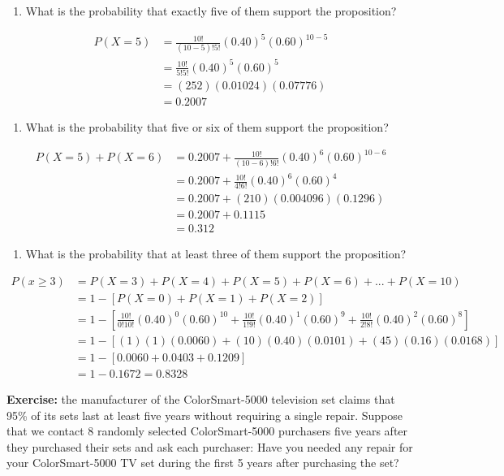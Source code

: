 \documentclass[
]{book}
\providecommand{\tightlist}{%
  \setlength{\itemsep}{0pt}\setlength{\parskip}{0pt}}
\begin{document}
\begin{enumerate}
\def\labelenumi{\arabic{enumi}.}
\tightlist
\item
  What is the probability that exactly five of them support the proposition?
\end{enumerate}

\[
\begin{aligned}
P(X=5)&=\frac{10!}{(10-5)!5!}(0.40)^5(0.60)^{10-5} \\
&=\frac{10!}{5!5!}(0.40)^5(0.60)^5 \\
&=(252)(0.01024)(0.07776) \\
&=0.2007
\end{aligned}
\]

\begin{enumerate}
\def\labelenumi{\arabic{enumi}.}
\setcounter{enumi}{1}
\tightlist
\item
  What is the probability that five or six of them support the proposition?
\end{enumerate}

\[
\begin{aligned}
P(X=5)+P(X=6)&=0.2007+\frac{10!}{(10-6)!6!}(0.40)^6(0.60)^{10-6} \\
&=0.2007+\frac{10!}{4!6!}(0.40)^6(0.60)^4 \\
&=0.2007+(210)(0.004096)(0.1296) \\
&=0.2007+0.1115 \\
&=0.312
\end{aligned}
\]

\begin{enumerate}
\def\labelenumi{\arabic{enumi}.}
\setcounter{enumi}{2}
\tightlist
\item
  What is the probability that at least three of them support the proposition?
\end{enumerate}

\[
\begin{aligned}
P(x \ge 3) &= P(X=3)+P(X=4)+P(X=5)+P(X=6)+...+P(X=10) \\
&=1-[P(X=0)+P(X=1)+P(X=2)] \\
&=1-[\frac{10!}{0!10!}(0.40)^0(0.60)^{10}+\frac{10!}{1!9!}(0.40)^1(0.60)^9+\frac{10!}{2!8!}(0.40)^2(0.60)^8] \\
&=1-[(1)(1)(0.0060)+(10)(0.40)(0.0101)+(45)(0.16)(0.0168)] \\
&=1-[0.0060+0.0403+0.1209] \\
&=1-0.1672 = 0.8328
\end{aligned}
\]

\textbf{Exercise:} the manufacturer of the ColorSmart-5000 television set claims that 95\% of
its sets last at least five years without requiring a single repair. Suppose that we contact 8 randomly selected ColorSmart-5000 purchasers five years after they purchased their sets and ask each purchaser: Have you needed any repair for your ColorSmart-5000 TV set during the first 5 years after purchasing the set?
\end{document}
